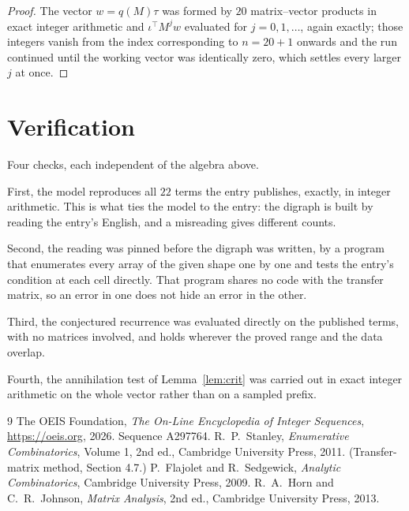 \documentclass[11pt,a4paper]{article}
\theoremstyle{plain}
\theoremstyle{definition}
\begin{document}
\begin{proof}
The vector $w=q(M)\tau$ was formed by $20$ matrix--vector products in exact integer
arithmetic and $\iota^{\!\top}M^{j}w$ evaluated for $j=0,1,\dots$, again exactly; those
integers vanish from the index corresponding to $n=20+1$ onwards and the run continued
until the working vector was identically zero, which settles every larger $j$ at once.
\end{proof}

\section{Verification}

Four checks, each independent of the algebra above.

First, the model reproduces all $22$ terms the entry publishes, exactly, in integer
arithmetic. This is what ties the model to the entry: the digraph is built by reading the
entry's English, and a misreading gives different counts.

Second, the reading was pinned before the digraph was written, by a program that enumerates
every array of the given shape one by one and tests the entry's condition at each cell
directly. That program shares no code with the transfer matrix, so an error in one does not
hide an error in the other.

Third, the conjectured recurrence was evaluated directly on the published terms, with no
matrices involved, and holds wherever the proved range and the data overlap.

Fourth, the annihilation test of Lemma~\ref{lem:crit} was carried out in exact integer
arithmetic on the whole vector rather than on a sampled prefix.

\begin{thebibliography}{9}
 The OEIS Foundation, \emph{The On-Line Encyclopedia of Integer
Sequences}, \url{https://oeis.org}, 2026. Sequence A297764.
 R.~P.~Stanley, \emph{Enumerative Combinatorics}, Volume 1, 2nd ed.,
Cambridge University Press, 2011. (Transfer-matrix method, Section 4.7.)
 P.~Flajolet and R.~Sedgewick, \emph{Analytic Combinatorics}, Cambridge
University Press, 2009.
 R.~A.~Horn and C.~R.~Johnson, \emph{Matrix Analysis}, 2nd ed., Cambridge
University Press, 2013.
\end{thebibliography}
\end{document}
